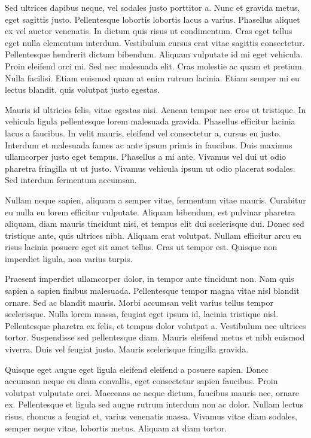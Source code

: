 \documentclass[%
 reprint,
 amsmath,amssymb,
 aps,
]{revtex4-2}
\begin{document}
Sed ultrices dapibus neque, vel sodales justo porttitor a. Nunc et gravida metus, eget sagittis justo. Pellentesque lobortis lobortis lacus a varius. Phasellus aliquet ex vel auctor venenatis. In dictum quis risus ut condimentum. Cras eget tellus eget nulla elementum interdum. Vestibulum cursus erat vitae sagittis consectetur. Pellentesque hendrerit dictum bibendum. Aliquam vulputate id mi eget vehicula. Proin eleifend orci mi. Sed nec malesuada elit. Cras molestie ac quam et pretium. Nulla facilisi. Etiam euismod quam at enim rutrum lacinia. Etiam semper mi eu lectus blandit, quis volutpat justo egestas.

Mauris id ultricies felis, vitae egestas nisi. Aenean tempor nec eros ut tristique. In vehicula ligula pellentesque lorem malesuada gravida. Phasellus efficitur lacinia lacus a faucibus. In velit mauris, eleifend vel consectetur a, cursus eu justo. Interdum et malesuada fames ac ante ipsum primis in faucibus. Duis maximus ullamcorper justo eget tempus. Phasellus a mi ante. Vivamus vel dui ut odio pharetra fringilla ut ut justo. Vivamus vehicula ipsum ut odio placerat sodales. Sed interdum fermentum accumsan.

Nullam neque sapien, aliquam a semper vitae, fermentum vitae mauris. Curabitur eu nulla eu lorem efficitur vulputate. Aliquam bibendum, est pulvinar pharetra aliquam, diam mauris tincidunt nisi, et tempus elit dui scelerisque dui. Donec sed tristique ante, quis ultrices nibh. Aliquam erat volutpat. Nullam efficitur arcu eu risus lacinia posuere eget sit amet tellus. Cras ut tempor est. Quisque non imperdiet ligula, non varius turpis.

Praesent imperdiet ullamcorper dolor, in tempor ante tincidunt non. Nam quis sapien a sapien finibus malesuada. Pellentesque tempor magna vitae nisl blandit ornare. Sed ac blandit mauris. Morbi accumsan velit varius tellus tempor scelerisque. Nulla lorem massa, feugiat eget ipsum id, lacinia tristique nisl. Pellentesque pharetra ex felis, et tempus dolor volutpat a. Vestibulum nec ultrices tortor. Suspendisse sed pellentesque diam. Mauris eleifend metus et nibh euismod viverra. Duis vel feugiat justo. Mauris scelerisque fringilla gravida.

Quisque eget augue eget ligula eleifend eleifend a posuere sapien. Donec accumsan neque eu diam convallis, eget consectetur sapien faucibus. Proin volutpat vulputate orci. Maecenas ac neque dictum, faucibus mauris nec, ornare ex. Pellentesque et ligula sed augue rutrum interdum non ac dolor. Nullam lectus risus, rhoncus a feugiat et, varius venenatis massa. Vivamus vitae diam sodales, semper neque vitae, lobortis metus. Aliquam at diam tortor.
\end{document}
